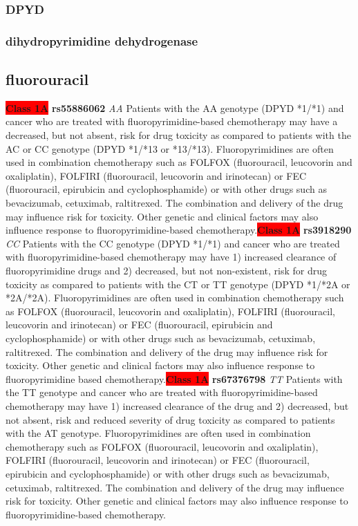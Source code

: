 \documentclass{book}
\begin{document}
\subsubsection{ DPYD }
\subsubsection{ dihydropyrimidine dehydrogenase }

\subsection{ fluorouracil }


\begin{center}
\textbf{\colorbox{red} {Class 1A}} \textbf{ rs55886062 } \textit{ AA }
Patients with the AA genotype (DPYD *1/*1) and cancer who are treated with fluoropyrimidine-based chemotherapy may have a decreased, but not absent, risk for drug toxicity as compared to patients with the AC or CC genotype (DPYD *1/*13 or *13/*13). Fluoropyrimidines are often used in combination chemotherapy such as FOLFOX (fluorouracil, leucovorin and oxaliplatin), FOLFIRI (fluorouracil, leucovorin and irinotecan) or FEC (fluorouracil, epirubicin and cyclophosphamide) or with other drugs such as bevacizumab, cetuximab, raltitrexed. The combination and delivery of the drug may influence risk for toxicity. Other genetic and clinical factors may also influence response to fluoropyrimidine-based chemotherapy.\textbf{\colorbox{red} {Class 1A}} \textbf{ rs3918290 } \textit{ CC }
Patients with the CC genotype (DPYD *1/*1) and cancer who are treated with fluoropyrimidine-based chemotherapy may have 1) increased clearance of fluoropyrimidine drugs and 2) decreased, but not non-existent, risk for drug toxicity as compared to patients with the CT or TT genotype (DPYD *1/*2A or *2A/*2A). Fluoropyrimidines are often used in combination chemotherapy such as FOLFOX (fluorouracil, leucovorin and oxaliplatin), FOLFIRI (fluorouracil,  leucovorin and irinotecan) or FEC (fluorouracil, epirubicin and cyclophosphamide) or with other drugs such as bevacizumab, cetuximab, raltitrexed. The combination and delivery of the drug may influence risk for toxicity. Other genetic and clinical factors may also influence response to fluoropyrimidine based chemotherapy.\textbf{\colorbox{red} {Class 1A}} \textbf{ rs67376798 } \textit{ TT }
Patients with the TT genotype and cancer who are treated with fluoropyrimidine-based chemotherapy may have 1) increased clearance of the drug and 2) decreased, but not absent, risk and reduced severity of drug toxicity as compared to patients with the AT genotype. Fluoropyrimidines are often used in combination chemotherapy such as FOLFOX (fluorouracil, leucovorin and oxaliplatin), FOLFIRI (fluorouracil, leucovorin and irinotecan) or FEC (fluorouracil, epirubicin and cyclophosphamide) or with other drugs such as bevacizumab, cetuximab, raltitrexed. The combination and delivery of the drug may influence risk for toxicity. Other genetic and clinical factors may also influence response to fluoropyrimidine-based chemotherapy.




\end{center}
\end{document}
